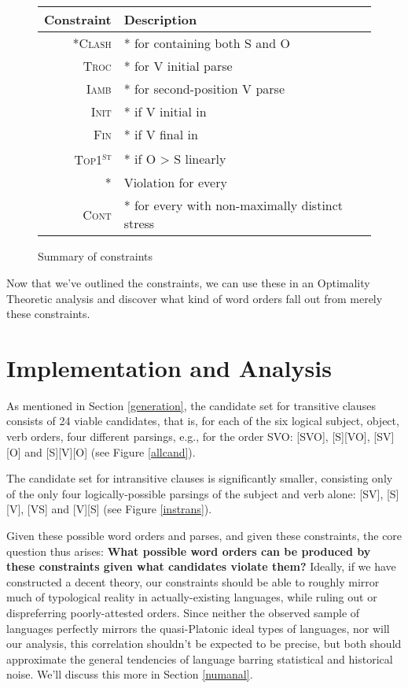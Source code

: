 \documentclass{article}
\newcommand{\noclash}{\textsc{*Clash}}
\newcommand{\iamb}{\textsc{Iamb}}
\newcommand{\cont}{\textsc{Cont}}
\newcommand{\topf}{\textsc{Top1\textsuperscript{st}}}
\newcommand{\nophi}{\textsc{*\textphi}}
\newcommand{\finphi}{\textsc{Fin\textphi}}
\newcommand{\initphi}{\textsc{Init\textphi}}
\newcommand{\troc}{\textsc{Troc}}
\begin{document}
 \begin{figure}
	 \begin{center}
		 \begin{tabular}{rl}
			 Constraint&Description\\\hline\hline
			 \noclash&* for {\textphi} containing both S and O\\
			 \troc&* for V initial parse\\
			 \iamb&* for second-position V parse\\
			 \initphi&* if V initial in \textphi\\
			 \finphi&* if V final in \textphi\\
			 \topf&* if O {\textgreater} S linearly\\
			 \nophi&Violation for every {\textphi}\\
			 \cont&* for every {\textphi} with non-maximally distinct stress \\
		 \end{tabular}
	 \end{center}

	 \caption{Summary of constraints\label{consum}}
 \end{figure}

 Now that we've outlined the constraints, we can use these in an Optimality Theoretic analysis and discover what kind of word orders fall out from merely these constraints.

\section{Implementation and Analysis}

As mentioned in Section \ref{generation}, the candidate set for transitive clauses consists of 24 viable candidates, that is, for each of the six logical subject, object, verb orders, four different parsings, e.g., for the order SVO: [SVO], [S][VO], [SV][O] and [S][V][O] (see Figure \ref{allcand}).

The candidate set for intransitive clauses is significantly smaller, consisting only of the only four logically-possible parsings of the subject and verb alone: [SV], [S][V], [VS] and [V][S] (see Figure \ref{instrans}).

Given these possible word orders and parses, and given these constraints, the core question thus arises: \textbf{What possible word orders can be produced by these constraints given what candidates violate them?}
Ideally, if we have constructed a decent theory, our constraints should be able to roughly mirror much of typological reality in actually-existing languages, while ruling out or dispreferring poorly-attested orders.
Since neither the observed sample of languages perfectly mirrors the quasi-Platonic ideal types of languages, nor will our analysis, this correlation shouldn't be expected to be precise, but both should approximate the general tendencies of language barring statistical and historical noise. We'll discuss this more in Section \ref{numanal}.
\end{document}
